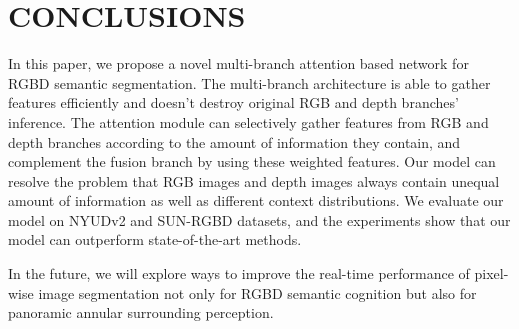 \documentclass{article}
\begin{document}
\section{CONCLUSIONS}
\label{sec:conclusions}

In this paper, we propose a novel multi-branch attention based network for RGBD semantic segmentation. The multi-branch architecture is able to gather features efficiently and doesn't destroy original RGB and depth branches' inference. The attention module can selectively gather features from RGB and depth branches according to the amount of information they contain, and complement the fusion branch by using these weighted features. Our model can resolve the problem that RGB images and depth images always contain unequal amount of information as well as different context distributions. We evaluate our model on NYUDv2 and SUN-RGBD datasets, and the experiments show that our model can outperform state-of-the-art methods.

In the future, we will explore ways to improve the real-time performance of pixel-wise image segmentation not only for RGBD semantic cognition but also for panoramic annular surrounding perception.


\newpage


\end{document}
